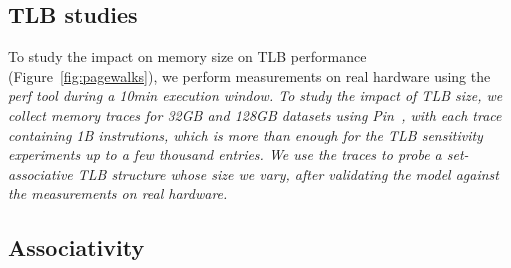 
\subsection{TLB studies}
To study the impact on memory size on  TLB performance (Figure~\ref{fig:pagewalks}), we perform measurements on real hardware using the \it{perf} tool during a 10min execution window. To study the impact of TLB size, we collect memory traces for 32GB and 128GB datasets using Pin~\cite{luk:pin}, with each trace containing 1B instrutions, which is more than enough for the TLB sensitivity experiments up to a few thousand entries. We use the traces to probe a set-associative TLB structure whose size we vary, after validating the model against the measurements on real hardware. 

\subsection{Associativity}


